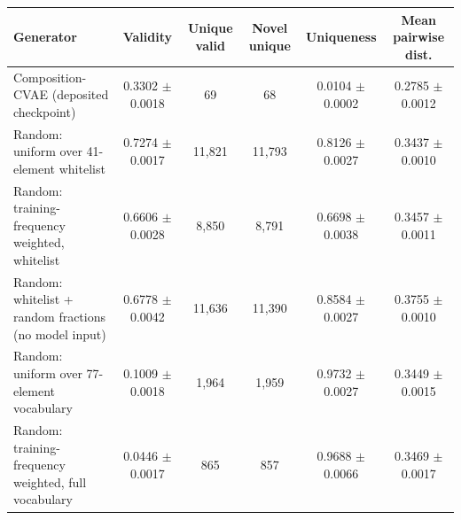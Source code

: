 \begin{tabular}{lccccc}
\toprule
Generator & Validity & Unique valid & Novel unique & Uniqueness & Mean pairwise dist. \\
\midrule
Composition-CVAE (deposited checkpoint) & 0.3302 $\pm$ 0.0018 & 69 & 68 & 0.0104 $\pm$ 0.0002 & 0.2785 $\pm$ 0.0012 \\
Random: uniform over 41-element whitelist & 0.7274 $\pm$ 0.0017 & 11,821 & 11,793 & 0.8126 $\pm$ 0.0027 & 0.3437 $\pm$ 0.0010 \\
Random: training-frequency weighted, whitelist & 0.6606 $\pm$ 0.0028 & 8,850 & 8,791 & 0.6698 $\pm$ 0.0038 & 0.3457 $\pm$ 0.0011 \\
Random: whitelist + random fractions (no model input) & 0.6778 $\pm$ 0.0042 & 11,636 & 11,390 & 0.8584 $\pm$ 0.0027 & 0.3755 $\pm$ 0.0010 \\
Random: uniform over 77-element vocabulary & 0.1009 $\pm$ 0.0018 & 1,964 & 1,959 & 0.9732 $\pm$ 0.0027 & 0.3449 $\pm$ 0.0015 \\
Random: training-frequency weighted, full vocabulary & 0.0446 $\pm$ 0.0017 & 865 & 857 & 0.9688 $\pm$ 0.0066 & 0.3469 $\pm$ 0.0017 \\
\bottomrule
\end{tabular}
